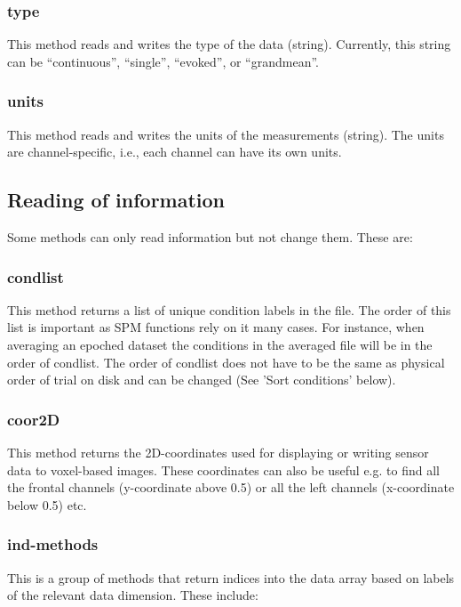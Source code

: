 \subsubsection{type}
This method reads and writes the type of the data (string). Currently, this string can be ``continuous'', ``single'', ``evoked'', or ``grandmean''.

\subsubsection{units}
This method reads and writes the units of the measurements (string). The units are channel-specific, i.e., each channel can have its own units.

\subsection{Reading of information}
Some methods can only read information but not change them. These are:

\subsubsection{condlist}
This method returns a list of unique condition labels in the file. The order of this list is important as SPM functions rely on it many cases. For instance, when averaging an epoched dataset the conditions in the averaged file will be in the order of condlist. The order of condlist does not have to be the same as physical order of trial on disk and can be changed (See 'Sort conditions' below).

\subsubsection{coor2D}
This method returns the 2D-coordinates used for displaying or writing sensor data to voxel-based images. These coordinates can also be useful e.g. to find all the frontal channels (y-coordinate above 0.5) or all the left channels (x-coordinate below 0.5) etc.

\subsubsection{ind-methods}
This is a group of methods that return indices into the data array based on labels of the relevant data dimension. These include:

